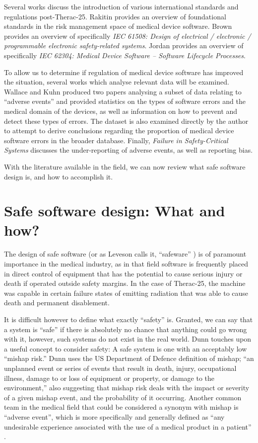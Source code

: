 \documentclass{cshonours}
\newcommand{\ther}{Therac-25\xspace}
\begin{document}
Several works discuss the introduction of various international standards and regulations post-\ther. Rakitin \cite{rakitin2006coping} provides an overview of foundational standards in the risk management space of medical device software. Brown \cite{iec61508} provides an overview of specifically \textit{IEC 61508: Design of electrical / electronic / programmable electronic safety-related systems}. Jordan \cite{jordan2006standard} provides an overview of specifically \textit{IEC 62304: Medical Device Software -- Software Lifecycle Processes}.

To allow us to determine if regulation of medical device software has improved the situation, several works which analyse relevant data will be examined. Wallace and Kuhn produced two papers \cite{wallace1999lessons,wallace2001failure} analysing a subset of \fda data relating to ``adverse events'' and provided statistics on the types of software errors and the medical domain of the devices, as well as information on how to prevent and detect these types of errors. The \fda \maude dataset \cite{maude} is also examined directly by the author to attempt to derive conclusions regarding the proportion of medical device software errors in the broader \maude database. Finally, \textit{Failure in Safety-Critical Systems} \cite[ch.~5]{johnson2003failure} discusses the under-reporting of adverse events, as well as reporting bias.

With the literature available in the field, we can now review what safe software design is, and how to accomplish it.


\chapter{Safe software design: What and how?}
\label{chap:safesoftware}
The design of safe software (or as Leveson calls it, ``safeware'' \cite{safeware}) is of paramount importance in the medical industry, as in that field software is frequently placed in direct control of equipment that has the potential to cause serious injury or death if operated outside safety margins. In the case of \ther, the machine was capable in certain failure states of emitting radiation that was able to cause death and permanent disablement.

It is difficult however to define what exactly ``safety'' is. Granted, we can say that a system is ``safe'' if there is absolutely no chance that anything could go wrong with it, however, such systems do not exist in the real world. Dunn \cite{dunn2003designing} touches upon a useful concept to consider safety: A safe system is one with an acceptably low ``mishap risk.'' Dunn uses the US Department of Defence definition of mishap; ``an unplanned event or series of events that result in death, injury, occupational illness, damage to or loss of equipment or property, or damage to the environment,'' also suggesting that mishap risk deals with the impact or severity of a given mishap event, and the probability of it occurring. Another common team in the medical field that could be considered a synonym with mishap is ``adverse event'', which is more specifically and generally defined as ``any undesirable experience associated with the use of a medical product in a patient'' \cite{fdaadverse}.
\end{document}
